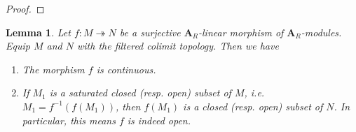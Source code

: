 \documentclass[10pt]{article}
\newtheorem{lem}[thm]{Lemma}
\numberwithin{equation}{section}
\newcommand{\calL}{{\mathcal L}}
\newcommand{\Isom}{{\mathrm{Isom}}}         %
\newcommand{\Spec}{{\mathrm{Spec}}}         %
\newcommand{\bfA}{{\textbf{A}}}
\begin{document}
\begin{proof}
\end{proof}




\begin{lem}\label{key-1}
    Let $f:M\twoheadrightarrow N$ be a surjective $\bfA_R$-linear morphism of $\bfA_R$-modules. Equip $M$ and $N$ with the filtered colimit topology. Then we have \begin{enumerate}
        \item The morphism $f$ is continuous.
        \item If $M_1$ is a saturated closed (resp. open) subset of $M$, i.e. $M_1=f^{-1}(f(M_1))$, then $f(M_1)$ is a closed (resp. open) subset of $N$. In particular, this means $f$ is indeed open. 
    \end{enumerate} 
\end{lem}
\end{document}
